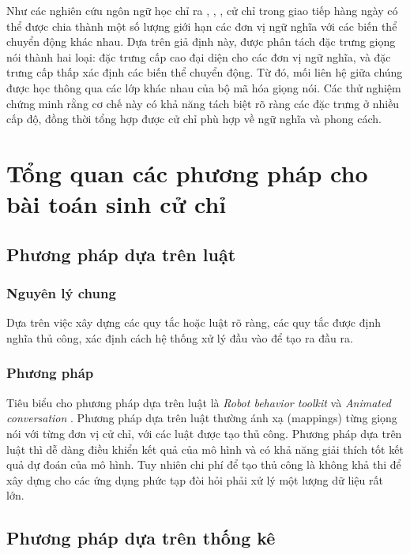 Như các nghiên cứu ngôn ngữ học chỉ ra \cite{kipp2005gesture}, \cite{neff2008gesture}, \cite{webb1997linguistic}, cử chỉ trong giao tiếp hàng ngày có thể được chia thành một số lượng giới hạn các đơn vị ngữ nghĩa với các biến thể chuyển động khác nhau. Dựa trên giả định này, được phân tách đặc trưng giọng nói thành hai loại: đặc trưng cấp cao đại diện cho các đơn vị ngữ nghĩa, và đặc trưng cấp thấp xác định các biến thể chuyển động. Từ đó, mối liên hệ giữa chúng được học thông qua các lớp khác nhau của bộ mã hóa giọng nói. Các thử nghiệm chứng minh rằng cơ chế này có khả năng tách biệt rõ ràng các đặc trưng ở nhiều cấp độ, đồng thời tổng hợp được cử chỉ phù hợp về ngữ nghĩa và phong cách.



\section{Tổng quan các phương pháp cho bài toán sinh cử chỉ}
\label{sec:relatedwork}



\subsection{Phương pháp dựa trên luật}

\subsubsection{Nguyên lý chung}

Dựa trên việc xây dựng các quy tắc hoặc luật rõ ràng, các quy tắc được định nghĩa thủ công, xác định cách hệ thống xử lý đầu vào để tạo ra đầu ra.

\subsubsection{Phương pháp}

Tiêu biểu cho phương pháp dựa trên luật là \textit{Robot behavior toolkit} \cite{huang2012robot} và  \textit{Animated conversation} \cite{cassell1994animated}.
Phương pháp dựa trên luật thường ánh xạ (mappings) từng giọng nói với từng đơn vị cử chỉ, với các luật được tạo thủ công. Phương pháp dựa trên luật thì dễ dàng điều khiển kết quả của mô hình và có khả năng giải thích tốt kết quả dự đoán của mô hình.
Tuy nhiên chi phí để tạo thủ công là không khả thi để xây dựng cho các ứng dụng phức tạp đòi hỏi phải xử lý một lượng dữ liệu rất lớn.

\subsection{Phương pháp dựa trên thống kê}

